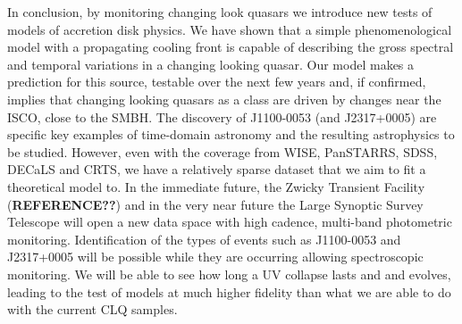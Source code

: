 \documentclass{nature}
\begin{document}
In conclusion, by monitoring changing look quasars we introduce new tests of models of accretion disk physics. We have shown that a simple phenomenological model with a propagating cooling front is capable of describing the gross spectral and temporal variations in a changing looking quasar. Our model makes a prediction for this source, testable over the next few years and, if confirmed, implies that changing looking quasars as a class are driven by changes near the ISCO, close to the SMBH. The discovery of J1100-0053 (and J2317+0005) are specific key examples of time-domain astronomy and the resulting astrophysics to be studied. However, even with the coverage from WISE, PanSTARRS, SDSS, DECaLS and CRTS, we have a relatively sparse dataset that we aim to fit a theoretical model to. In the immediate future, the Zwicky Transient Facility ({\bf REFERENCE??}) and in the very near future the Large Synoptic Survey Telescope \citep{Ivezic2008, LSST_ScienceBookV2} will open a new data space with high cadence, multi-band photometric monitoring. Identification of the types of events such as J1100-0053 and J2317+0005 will be possible while they are occurring allowing spectroscopic monitoring. We will be able to see how long a UV collapse lasts and and evolves, leading to the test of models at much higher fidelity than what we are able to do with the current CLQ samples.




%

\end{document}
